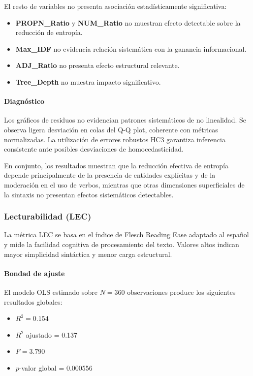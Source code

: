 El resto de variables no presenta asociación estadísticamente significativa:

\begin{itemize}
\item \textbf{PROPN\_Ratio} y \textbf{NUM\_Ratio} no muestran efecto detectable sobre la reducción de entropía.
\item \textbf{Max\_IDF} no evidencia relación sistemática con la ganancia informacional.
\item \textbf{ADJ\_Ratio} no presenta efecto estructural relevante.
\item \textbf{Tree\_Depth} no muestra impacto significativo.
\end{itemize}

\paragraph{Diagnóstico}

Los gráficos de residuos no evidencian patrones sistemáticos de no linealidad. Se observa ligera desviación en colas del Q-Q plot, coherente con métricas normalizadas. La utilización de errores robustos HC3 garantiza inferencia consistente ante posibles desviaciones de homocedasticidad.

En conjunto, los resultados muestran que la reducción efectiva de entropía depende principalmente de la presencia de entidades explícitas y de la moderación en el uso de verbos, mientras que otras dimensiones superficiales de la sintaxis no presentan efectos sistemáticos detectables.

\subsubsection{Lecturabilidad (LEC)}

La métrica LEC se basa en el índice de Flesch Reading Ease adaptado al español y mide la facilidad cognitiva de procesamiento del texto. Valores altos indican mayor simplicidad sintáctica y menor carga estructural.

\paragraph{Bondad de ajuste}

El modelo OLS estimado sobre $N = 360$ observaciones produce los siguientes resultados globales:

\begin{itemize}
\item $R^2 = 0.154$
\item $R^2$ ajustado = 0.137
\item $F = 3.790$
\item $p$-valor global = 0.000556
\end{itemize}

